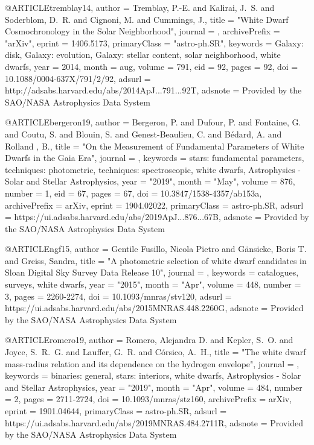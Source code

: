 \documentclass[a4paper,fleqn,usenatbib]{mnras}
\begin{document}
{{{{{{{{{{{@ARTICLE{tremblay14,
   author = {{Tremblay}, P.-E. and {Kalirai}, J.~S. and {Soderblom}, D.~R. and 
	{Cignoni}, M. and {Cummings}, J.},
    title = "{White Dwarf Cosmochronology in the Solar Neighborhood}",
  journal = {\apj},
archivePrefix = "arXiv",
   eprint = {1406.5173},
 primaryClass = "astro-ph.SR",
 keywords = {Galaxy: disk, Galaxy: evolution, Galaxy: stellar content, solar neighborhood, white dwarfs},
     year = 2014,
    month = aug,
   volume = 791,
      eid = {92},
    pages = {92},
      doi = {10.1088/0004-637X/791/2/92},
   adsurl = {http://adsabs.harvard.edu/abs/2014ApJ...791...92T},
  adsnote = {Provided by the SAO/NASA Astrophysics Data System}
}


@ARTICLE{bergeron19,
       author = {{Bergeron}, P. and {Dufour}, P. and {Fontaine}, G. and {Coutu}, S. and
         {Blouin}, S. and {Genest-Beaulieu}, C. and {B{\'e}dard}, A. and {Rolland
        }, B.},
        title = "{On the Measurement of Fundamental Parameters of White Dwarfs in the Gaia Era}",
      journal = {\apj},
     keywords = {stars: fundamental parameters, techniques: photometric, techniques: spectroscopic, white dwarfs, Astrophysics - Solar and Stellar Astrophysics},
         year = "2019",
        month = "May",
       volume = {876},
       number = {1},
          eid = {67},
        pages = {67},
          doi = {10.3847/1538-4357/ab153a},
archivePrefix = {arXiv},
       eprint = {1904.02022},
 primaryClass = {astro-ph.SR},
       adsurl = {https://ui.adsabs.harvard.edu/abs/2019ApJ...876...67B},
      adsnote = {Provided by the SAO/NASA Astrophysics Data System}
}

@ARTICLE{ngf15,
       author = {{Gentile Fusillo}, Nicola Pietro and {G{\"a}nsicke}, Boris T. and
         {Greiss}, Sandra},
        title = "{A photometric selection of white dwarf candidates in Sloan Digital Sky Survey Data Release 10}",
      journal = {\mnras},
     keywords = {catalogues, surveys, white dwarfs},
         year = "2015",
        month = "Apr",
       volume = {448},
       number = {3},
        pages = {2260-2274},
          doi = {10.1093/mnras/stv120},
       adsurl = {https://ui.adsabs.harvard.edu/abs/2015MNRAS.448.2260G},
      adsnote = {Provided by the SAO/NASA Astrophysics Data System}
}

@ARTICLE{romero19,
       author = {{Romero}, Alejandra D. and {Kepler}, S.~O. and {Joyce}, S.~R.~G. and
         {Lauffer}, G.~R. and {C{\'o}rsico}, A.~H.},
        title = "{The white dwarf mass-radius relation and its dependence on the hydrogen envelope}",
      journal = {\mnras},
     keywords = {binaries: general, stars: interiors, white dwarfs, Astrophysics - Solar and Stellar Astrophysics},
         year = "2019",
        month = "Apr",
       volume = {484},
       number = {2},
        pages = {2711-2724},
          doi = {10.1093/mnras/stz160},
archivePrefix = {arXiv},
       eprint = {1901.04644},
 primaryClass = {astro-ph.SR},
       adsurl = {https://ui.adsabs.harvard.edu/abs/2019MNRAS.484.2711R},
      adsnote = {Provided by the SAO/NASA Astrophysics Data System}
}

}}}}}}}}}}}
\end{document}
